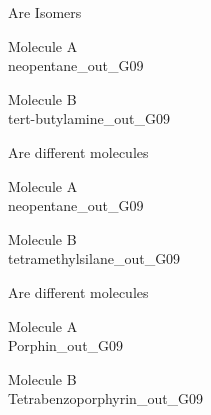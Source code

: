 \begin{center}
\vtab
\vtab
\textcolor{NavyBlue}{\Large Are Isomers}
\end{center}
\newpage
\begin{multicols}{2}
\begin{center}
Molecule A \\ 
neopentane\_out\_G09
\vtab

\columnbreak

Molecule B \\ 
tert-butylamine\_out\_G09
\vtab
\end{center}
\end{multicols}
\begin{center}
\vtab
\vtab
\textcolor{NavyBlue}{\large Are different molecules}
\end{center}
\newpage
\begin{multicols}{2}
\begin{center}
Molecule A \\ 
neopentane\_out\_G09
\vtab

\columnbreak

Molecule B \\ 
tetramethylsilane\_out\_G09
\vtab
\end{center}
\end{multicols}
\begin{center}
\vtab
\vtab
\textcolor{NavyBlue}{\large Are different molecules}
\end{center}
\newpage
\begin{multicols}{2}
\begin{center}
Molecule A \\ 
Porphin\_out\_G09
\vtab

\columnbreak

Molecule B \\ 
Tetrabenzoporphyrin\_out\_G09
\vtab
\end{center}
\end{multicols}
